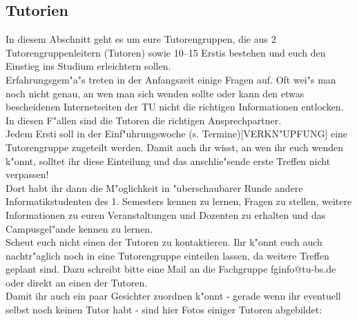 \subsection{Tutorien}

In diesem Abschnitt geht es um eure Tutorengruppen, die aus 2 Tutorengruppenleitern (Tutoren) sowie 10--15 Erstis bestehen und euch den Einstieg ins Studium erleichtern sollen.\\
Erfahrungsgem"a"s treten in der Anfangszeit einige Fragen auf. Oft wei"s man noch nicht genau, an wen man sich wenden sollte oder kann den etwas bescheidenen Internetseiten der TU nicht die richtigen Informationen entlocken. In diesen F"allen sind die Tutoren die richtigen Ansprechpartner.\\
Jedem Ersti soll in der Einf"uhrungswoche (s. Termine)[VERKN"UPFUNG] eine Tutorengruppe zugeteilt werden. Damit auch ihr wisst, an wen ihr euch wenden k"onnt, solltet ihr diese Einteilung und das anschlie"sende erste Treffen nicht verpassen!\\
Dort habt ihr dann die M"oglichkeit in "uberschaubarer Runde andere Informatikstudenten des 1. Semesters kennen zu lernen, Fragen zu stellen, weitere Informationen zu euren Veranstaltungen und Dozenten zu erhalten und das Campusgel"ande kennen zu lernen.\\
Scheut euch nicht einen der Tutoren zu kontaktieren. Ihr k"onnt euch auch nachtr"aglich noch in eine Tutorengruppe einteilen lassen, da weitere Treffen geplant sind. Dazu schreibt bitte eine Mail an die Fachgruppe fginfo@tu-bs.de oder direkt an einen der Tutoren.\\
Damit ihr auch ein paar Gesichter zuordnen k"onnt - gerade wenn ihr eventuell selbst noch keinen Tutor habt - sind hier Fotos einiger Tutoren abgebildet:

\captionsetup[subfloat]{labelformat=empty}

